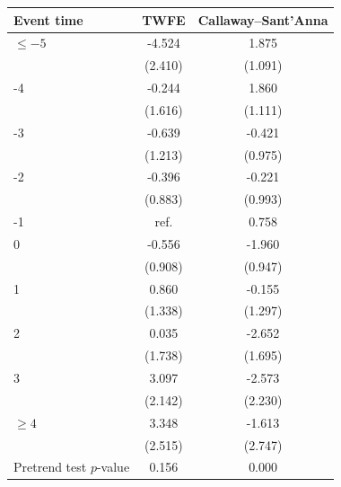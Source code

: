 \begin{tabular}{lcc}
\toprule
Event time & TWFE & Callaway--Sant'Anna \\
\midrule
\(\le -5\) & -4.524 &  1.875 \\
 & (2.410) & (1.091) \\
-4 & -0.244 &  1.860 \\
 & (1.616) & (1.111) \\
-3 & -0.639 & -0.421 \\
 & (1.213) & (0.975) \\
-2 & -0.396 & -0.221 \\
 & (0.883) & (0.993) \\
-1 & \multicolumn{1}{c}{ref.} &  0.758 \\
0 & -0.556 & -1.960 \\
 & (0.908) & (0.947) \\
1 &  0.860 & -0.155 \\
 & (1.338) & (1.297) \\
2 &  0.035 & -2.652 \\
 & (1.738) & (1.695) \\
3 &  3.097 & -2.573 \\
 & (2.142) & (2.230) \\
\(\ge 4\) &  3.348 & -1.613 \\
 & (2.515) & (2.747) \\
\midrule
Pretrend test \(p\)-value & 0.156 & 0.000 \\
\bottomrule
\end{tabular}
